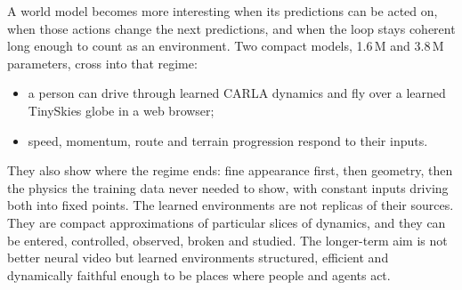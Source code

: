 \documentclass[11pt]{article}
\begin{document}
A world model becomes more interesting when its predictions can be acted on, when those actions change the next predictions, and when the loop stays coherent long enough to count as an environment. Two compact models, 1.6\,M and 3.8\,M parameters, cross into that regime:
\begin{itemize}
  \item a person can drive through learned CARLA dynamics and fly over a learned TinySkies globe in a web browser;
  \item speed, momentum, route and terrain progression respond to their inputs.
\end{itemize}
They also show where the regime ends: fine appearance first, then geometry, then the physics the training data never needed to show, with constant inputs driving both into fixed points. The learned environments are not replicas of their sources. They are compact approximations of particular slices of dynamics, and they can be entered, controlled, observed, broken and studied. The longer-term aim is not better neural video but learned environments structured, efficient and dynamically faithful enough to be places where people and agents act.
\end{document}
